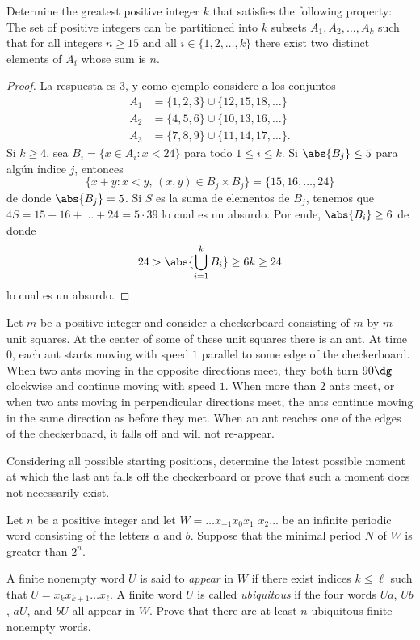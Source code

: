 \begin{probEG}[ISL 2011/C4]
  Determine the greatest positive integer $k$ that satisfies the following
  property: The set of positive integers can be partitioned into $k$ subsets
  $A_1,A_2,\dots,A_k$ such that for all integers $n\ge 15$ and all
  $i\in\{1,2,\dots,k\}$ there exist two distinct elements of $A_i$ whose sum is
  $n$.
\end{probEG}

\begin{proof}
  La respuesta es $3$, y como ejemplo considere a los conjuntos
  \begin{align*}
    A_1 &= \{1,2,3\}\cup\{12,15,18,\dots\} \\
    A_2 &= \{4,5,6\}\cup\{10,13,16,\dots\} \\
    A_3 &= \{7,8,9\}\cup\{11,14,17,\dots\}.
  \end{align*}
  Si $k\ge 4$, sea $B_i=\{x\in A_i:x<24\}$ para todo $1\le i\le k$. Si
  $\abs{B_j}\le 5$ para algún índice $j$, entonces
  \[\{x+y:x<y,\,(x,y)\in B_j\times B_j\}=\{15,16,\dots,24\}\]
  de donde $\abs{B_j}=5$. Si $S$ es la suma de elementos de $B_j$, tenemos que
  $4S=15+16+\dots+24=5\cdot 39$ lo cual es un absurdo. Por ende,
  $\abs{B_i}\ge 6$ de donde
  \[24>\abs{\bigcup_{i=1}^kB_i}\ge 6k\ge 24\]
  lo cual es un absurdo.
\end{proof}

\begin{probHR}[ISL 2011/C5]
  Let $m$ be a positive integer and consider a checkerboard consisting of $m$ by
  $m$ unit squares. At the center of some of these unit squares there is an ant.
  At time $0$, each ant starts moving with speed $1$ parallel to some edge of
  the checkerboard. When two ants moving in the opposite directions meet, they
  both turn $90\dg$ clockwise and continue moving with speed $1$. When more than
  $2$ ants meet, or when two ants moving in perpendicular directions meet, the
  ants continue moving in the same direction as before they met. When an ant
  reaches one of the edges of the checkerboard, it falls off and will not
  re-appear.

  Considering all possible starting positions, determine the latest possible
  moment at which the last ant falls off the checkerboard or prove that such a
  moment does not necessarily exist.
\end{probHR}


\begin{probEG}[ISL 2011/C6]
  Let $n$ be a positive integer and let $W=\dots x_{-1}x_0x_1$ $x_2\dots$ be an
  infinite periodic word consisting of the letters $a$ and $b$. Suppose that the
  minimal period $N$ of $W$ is greater than $2^n$.

  A finite nonempty word $U$ is said to \emph{appear} in $W$ if there exist
  indices $k\le\ell$ such that $U=x_kx_{k+1}\dots x_\ell$. A finite word $U$ is
  called \emph{ubiquitous} if the four words $Ua$, $Ub$, $aU$, and $bU$ all
  appear in $W$. Prove that there are at least $n$ ubiquitous finite nonempty
  words.
\end{probEG}


